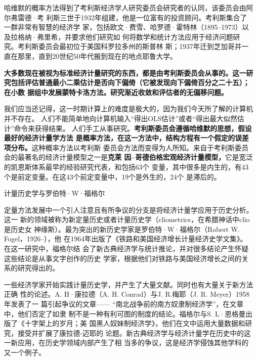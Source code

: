 哈维默的概率方法得到了考利斯经济学人研究委员会研究者的认同，该委员会由阿尔弗雷德·考
利斯三世于1932年组建，他是一位富有的投资顾问。考利斯集合了一群非常有智慧的经济学
家，包括欧文·费雪、哈罗德·霍特林（1895--1973）以及拉格纳·弗里希，并要求他们研究如
何将数学和统计方法应用于经济问题研究。考利斯委员会最初位于美国科罗拉多州的斯普林
斯；1937年迁到芝加哥并一直在那里，直到20世纪50年代搬到现在的地点耶鲁大学。

\textbf{大多数现在被视为标准经济计量研究的东西，都是由考利斯委员会从事的。这一研
  究包括评估普通最小二乘估计是否向下偏倚（它被发现向下偏倚百分之二十五）；在小数
  据组中发展蒙特卡洛方法。研究渐近收敛和评估者的无偏移问题。}

我们应当还记得，这一时期计算上的难度是极大的，因为我们今天所了解的计算机并不存在。
人们不能简单地向计算机输入“得出OLS估计”或者“得出最大似然估计”命令来获得结果。
人们手工从事研究。\textbf{考利斯委员会遵循哈维默的思想，假设最好的经济计量学方法
  是概率方法，在这一方法中，结构方程有一个假定的误差项分布。}这种概率方法以考利斯
委员会方法而变得为人所知。来自于考利斯委员会的最著名的经济计量模型之一是\textbf{克莱
因--哥德伯格宏观经济计量模型，}它是宽泛的凯恩斯体系最早的经验研究代表，和包括63个
变量，其中很多是内生的，有43个是前定变量。在这43个前定变量中，19个是外生的，24个
是滞后的。

\begin{mybox}{计量历史学与罗伯特·W·福格尔}
  \begin{multicols}{2}
    定量方法发展中一个引人注意且有所争议的分支是将经济计量学应用于历史分析。这一
    新的领域被称为新定量历史或者计量历史学（cliometrics，在希腊神话中clio是历史女
    神缘斯）。最为突出的新历史学家是罗伯特·W·福格尔（Robert W. Fogel，1926--），他
    在1964年出版了《铁路和美国经济增长计量经济史学文集》。在这一研究中，福格尔结
    会了新古典经济学与统计推论，并对很多结论产生怀疑这些结论是从事文字创作的历史
    学家，根据他们对铁路与美国经济增长之间的关系的研究得出的。

    一些经济学家开始实践计量历史学，并产生了大量文献。同时也有大量关于新方法正确
    性的论述。A. H·康拉德（A. H. Conrad）与J. R.梅耶（J. R. Meyer）1958年发表了一
    篇引起争议的文章—— “南北战争前的南方奴隶制经济学”，在文章中，他们否定了如隶
    制不是一种有利可图的制度的结论。福格尔与S. L·恩格曼出版了《十字架上的岁月；美
    国黑人奴妹制经济学》，他们在文中运用大量数据和研究，接受并扩展了康拉德-迈耶的
    论题。新古典经济学与经济计量学在历史中的这一新应用，在历史学领域内部产生了相
    当多的争议，这是经济学侵蚀其他学科的又一个例子。
  \end{multicols}
\end{mybox}

